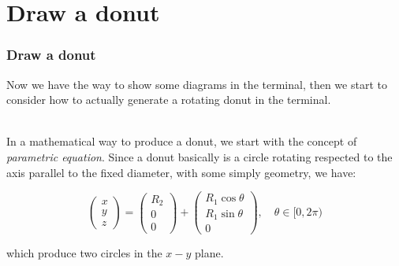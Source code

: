 \documentclass[12pt, t]{beamer}
\renewcommand{\emph}[1]{{\color{Turquoise3}\textsl{#1}}}
\newcommand{\nullspace}{~\\[15pt]}
\begin{document}
\section{Draw a donut}
\begin{frame}
    \frametitle{Draw a donut}

    Now we have the way to show some diagrams in the terminal, then we start to consider how to 
    actually generate a rotating donut in the terminal.

    \nullspace
    In a mathematical way to produce a donut, we start with the concept of \emph{parametric equation}.
    Since a donut basically is a circle rotating respected to the axis parallel to the fixed diameter,
    with some simply geometry, we have:

    \begin{equation*}
        \begin{pmatrix}
            x   \\
            y   \\
            z
        \end{pmatrix}
        =
        \begin{pmatrix}
            R_2 \\
            0   \\
            0
        \end{pmatrix}
        +
        \begin{pmatrix}
            R_1\cos{\theta} \\
            R_1\sin{\theta} \\
            0
        \end{pmatrix}
        ,\quad \theta \in [0,2\pi)
    \end{equation*}

    which produce two circles in the $x-y$ plane.

\end{frame}

\end{document}
